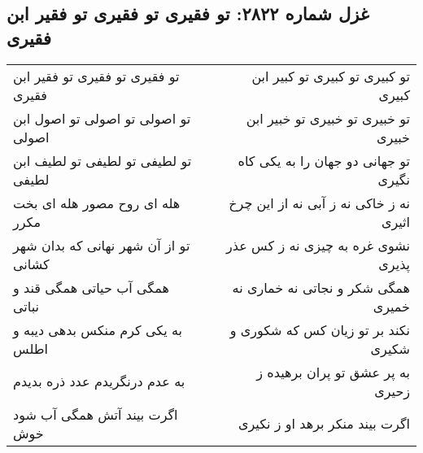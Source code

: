 \begin{center}
\section*{غزل شماره ۲۸۲۲: تو فقیری تو فقیری تو فقیر ابن فقیری}
\label{sec:2822}
\begin{longtable}{l p{0.5cm} r}
تو فقیری تو فقیری تو فقیر ابن فقیری
&&
تو کبیری تو کبیری تو کبیر ابن کبیری
\\
تو اصولی تو اصولی تو اصول ابن اصولی
&&
تو خبیری تو خبیری تو خبیر ابن خبیری
\\
تو لطیفی تو لطیفی تو لطیف ابن لطیفی
&&
تو جهانی دو جهان را به یکی کاه نگیری
\\
هله ای روح مصور هله ای بخت مکرر
&&
نه ز خاکی نه ز آبی نه از این چرخ اثیری
\\
تو از آن شهر نهانی که بدان شهر کشانی
&&
نشوی غره به چیزی نه ز کس عذر پذیری
\\
همگی آب حیاتی همگی قند و نباتی
&&
همگی شکر و نجاتی نه خماری نه خمیری
\\
به یکی کرم منکس بدهی دیبه و اطلس
&&
نکند بر تو زیان کس که شکوری و شکیری
\\
به عدم درنگریدم عدد ذره بدیدم
&&
به پر عشق تو پران برهیده ز زحیری
\\
اگرت بیند آتش همگی آب شود خوش
&&
اگرت بیند منکر برهد او ز نکیری
\\
\end{longtable}
\end{center}
